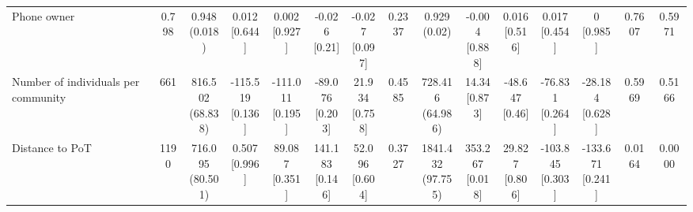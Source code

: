 \documentclass[
]{article}
\begin{document}
\begin{table}
{\begin{tabular}[t]{lcccccccccccccc}
\hspace{1em}Phone owner & 0.798 & \makecell[c]{0.948\\(0.018)} & \makecell[c]{0.012\\{[0.644]}} & \makecell[c]{0.002\\{[0.927]}} & \makecell[c]{-0.026\\{[0.21]}} & \makecell[c]{-0.027\\{[0.097]}} & 0.2337 & \makecell[c]{0.929\\(0.02)} & \makecell[c]{-0.004\\{[0.888]}} & \makecell[c]{0.016\\{[0.516]}} & \makecell[c]{0.017\\{[0.454]}} & \makecell[c]{0\\{[0.985]}} & 0.7607 & 0.5971\\
\hspace{1em}Number of individuals per community & 661 & \makecell[c]{816.502\\(68.838)} & \makecell[c]{-115.519\\{[0.136]}} & \makecell[c]{-111.011\\{[0.195]}} & \makecell[c]{-89.076\\{[0.203]}} & \makecell[c]{21.934\\{[0.758]}} & 0.4585 & \makecell[c]{728.416\\(64.986)} & \makecell[c]{14.34\\{[0.873]}} & \makecell[c]{-48.647\\{[0.46]}} & \makecell[c]{-76.831\\{[0.264]}} & \makecell[c]{-28.184\\{[0.628]}} & 0.5969 & 0.5166\\
\hspace{1em}Distance to PoT & 1190 & \makecell[c]{716.095\\(80.501)} & \makecell[c]{0.507\\{[0.996]}} & \makecell[c]{89.087\\{[0.351]}} & \makecell[c]{141.183\\{[0.146]}} & \makecell[c]{52.096\\{[0.604]}} & 0.3727 & \makecell[c]{1841.432\\(97.755)} & \makecell[c]{353.267\\{[0.018]}} & \makecell[c]{29.827\\{[0.806]}} & \makecell[c]{-103.845\\{[0.303]}} & \makecell[c]{-133.671\\{[0.241]}} & 0.0164 & 0.0000\\

\end{tabular}}
\end{table}
\end{document}

